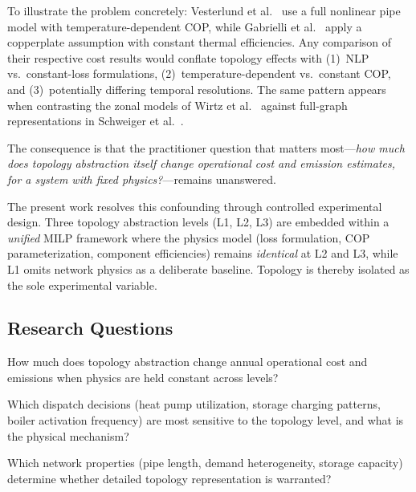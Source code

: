 \documentclass[review,3p]{elsarticle}
\begin{document}
To illustrate the problem concretely: Vesterlund et al.~\cite{Vesterlund2017}
use a full nonlinear pipe model with temperature-dependent COP, while
Gabrielli et al.~\cite{Gabrielli2018} apply a copperplate assumption
with constant thermal efficiencies. Any comparison of their respective
cost results would conflate topology effects with (1)~NLP vs.\
constant-loss formulations, (2)~temperature-dependent vs.\ constant
COP, and (3)~potentially differing temporal resolutions. The same
pattern appears when contrasting the zonal models of Wirtz et
al.~\cite{Wirtz2020} against full-graph representations in Schweiger
et al.~\cite{Schweiger2017}.

The consequence is that the practitioner question that matters
most---\emph{how much does topology abstraction itself change
operational cost and emission estimates, for a system with fixed
physics?}---remains unanswered.

The present work resolves this confounding through controlled
experimental design. Three topology abstraction levels (L1, L2, L3)
are embedded within a \emph{unified} MILP framework where the
physics model (loss formulation, COP parameterization, component
efficiencies) remains \emph{identical} at L2 and L3, while L1 omits
network physics as a deliberate baseline. Topology is thereby
isolated as the sole experimental variable.

\subsection{Research Questions}
\label{sec:rq}

\begin{description}[style=nextline]
    \item[RQ1 --- Topology Cost Impact:]
    How much does topology abstraction change annual operational cost
    and \ce{CO2} emissions when physics are held constant across levels?

    \item[RQ2 --- Dispatch Sensitivity:]
    Which dispatch decisions (heat pump utilization, storage charging
    patterns, boiler activation frequency) are most sensitive to the
    topology level, and what is the physical mechanism?

    \item[RQ3 --- Generalizability:]
    Which network properties (pipe length, demand heterogeneity,
    storage capacity) determine whether detailed topology
    representation is warranted?
\end{description}
\end{document}
